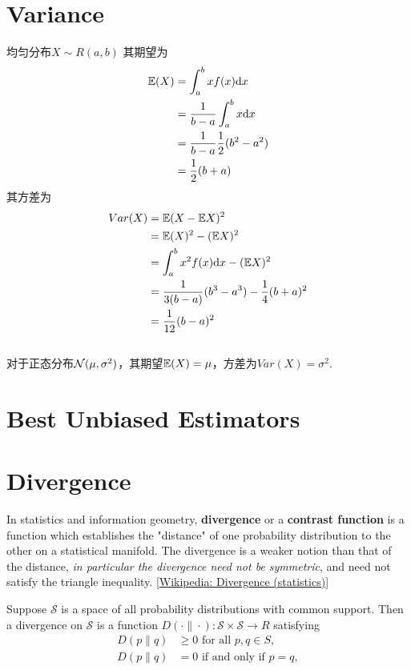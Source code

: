 \section{Variance}
均匀分布$X \sim R(a, b)$
其期望为
\begin{equation}
    \begin{split}
        \mathbb{E}(X) &= \int_{a}^{b}x f(x) \mathrm{d} x		\\
        &= \frac{1}{b-a}\int_{a}^{b}x \mathrm{d} x	\\
        &= \frac{1}{b-a} \frac{1}{2} (b^2 - a^2)	\\
        &= \frac{1}{2}(b + a)
    \end{split}
\end{equation}
其方差为
\begin{equation}
    \begin{split}
        Var(X) &= \mathbb{E}(X - \mathbb{E} X)^2  \\
        &= \mathbb{E}(X)^2 - (\mathbb{E} X)^2 \\
        &= \int_{a}^{b} x^2 f(x) \mathrm{d} x - (\mathbb{E} X)^2 \\
        &= \frac{1}{3(b-a)} (b^3 - a^3) - \frac{1}{4}(b+a)^2 \\
        &= \frac{1}{12}(b-a)^2
    \end{split}
\end{equation}
\\
对于正态分布$\mathcal{N}(\mu, \sigma ^2)$，其期望$\mathbb{E}(X) = \mu$，方差为$Var(X) = \sigma^2$.


\section{Best Unbiased Estimators}


\section{Divergence}
In statistics and information geometry, \textbf{divergence} or a \textbf{contrast function} is a function
which establishes the "distance" of one probability distribution to the other on a statistical manifold.
The divergence is a weaker notion than that of the distance, \textit{in particular the divergence need not be symmetric},
and need not satisfy the triangle inequality. [\href{https://en.wikipedia.org/wiki/Divergence_(statistics)}{Wikipedia: Divergence (statistics)}]

Suppose $\mathcal{S}$ is a space of all probability distributions with common support.
Then a divergence on $\mathcal{S}$ is a function $D(\cdot\|\cdot): \mathcal{S} \times \mathcal{S} \rightarrow R$ satisfying
\begin{equation}
    \begin{split}
        D(p\|q) &\geq 0 \text{ for all }p, q \in S, \\
        D(p\|q) &= 0\text{ if and only if }p = q,
    \end{split}
\end{equation}

